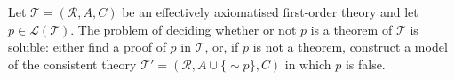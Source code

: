 Let $\mathcal{T} = (\mathcal{R}, A, C)$ be an effectively axiomatised first-order theory and let $p \in \mathcal{L}(\mathcal{T})$. The problem of deciding whether or not $p$ is a theorem of $\mathcal{T}$ is soluble: either find a proof of $p$ in $\mathcal{T}$, or, if $p$ is not a theorem, construct a model of the consistent theory $\mathcal{T}' = (\mathcal{R}, A \cup \{\sim p\}, C)$ in which $p$ is false.
